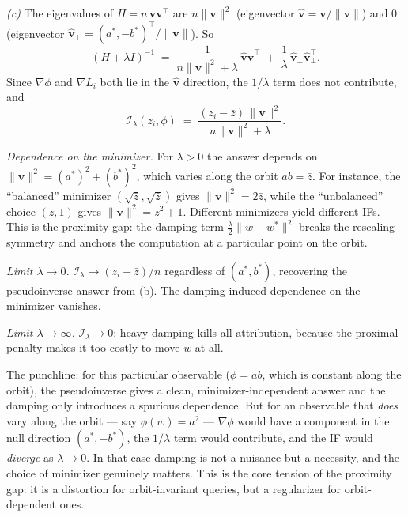 \documentclass[11pt]{article}
\begin{document}
\begin{solution}[ex:if-degenerate]
\textit{(c)} The eigenvalues of $H = n\,\mathbf{v}\mathbf{v}^\top$ are $n\|\mathbf{v}\|^2$ (eigenvector $\hat{\mathbf{v}} = \mathbf{v}/\|\mathbf{v}\|$) and $0$ (eigenvector $\hat{\mathbf{v}}_\perp = (a^*,-b^*)^\top/\|\mathbf{v}\|$). So
\[
  (H+\lambda I)^{-1}
  \;=\; \frac{1}{n\|\mathbf{v}\|^2+\lambda}\,\hat{\mathbf{v}}\hat{\mathbf{v}}^\top
  \;+\; \frac{1}{\lambda}\,\hat{\mathbf{v}}_\perp\hat{\mathbf{v}}_\perp^\top.
\]
Since $\nabla\phi$ and $\nabla L_i$ both lie in the $\hat{\mathbf{v}}$ direction, the $1/\lambda$ term does not contribute, and
\[
  \mathcal{I}_\lambda(z_i,\phi) \;=\; \frac{(z_i-\bar z)\,\|\mathbf{v}\|^2}{n\|\mathbf{v}\|^2 + \lambda}.
\]

\emph{Dependence on the minimizer.} For $\lambda > 0$ the answer depends on $\|\mathbf{v}\|^2 = (a^*)^2 + (b^*)^2$, which varies along the orbit $ab = \bar z$. For instance, the ``balanced'' minimizer $(\sqrt{\bar z},\sqrt{\bar z})$ gives $\|\mathbf{v}\|^2 = 2\bar z$, while the ``unbalanced'' choice $(\bar z,1)$ gives $\|\mathbf{v}\|^2 = \bar z^2 + 1$. Different minimizers yield different IFs. This is the proximity gap: the damping term $\tfrac\lambda2\|w-w^*\|^2$ breaks the rescaling symmetry and anchors the computation at a particular point on the orbit.

\emph{Limit $\lambda\to 0$.} $\mathcal{I}_\lambda \to (z_i-\bar z)/n$ regardless of $(a^*,b^*)$, recovering the pseudoinverse answer from (b). The damping-induced dependence on the minimizer vanishes.

\emph{Limit $\lambda\to\infty$.} $\mathcal{I}_\lambda \to 0$: heavy damping kills all attribution, because the proximal penalty makes it too costly to move $w$ at all.

The punchline: for this particular observable ($\phi = ab$, which is constant along the orbit), the pseudoinverse gives a clean, minimizer-independent answer and the damping only introduces a spurious dependence. But for an observable that \emph{does} vary along the orbit --- say $\phi(w) = a^2$ --- $\nabla\phi$ would have a component in the null direction $(a^*,-b^*)$, the $1/\lambda$ term would contribute, and the IF would \emph{diverge} as $\lambda\to 0$. In that case damping is not a nuisance but a necessity, and the choice of minimizer genuinely matters. This is the core tension of the proximity gap: it is a distortion for orbit-invariant queries, but a regularizer for orbit-dependent ones.

\end{solution}
\end{document}
